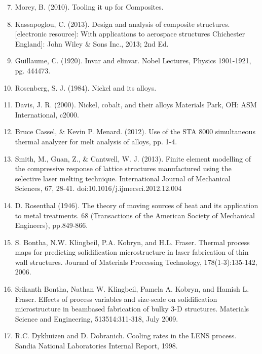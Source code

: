 \documentclass[10pt]{article}
\begin{document}
\begin{enumerate}
  \setcounter{enumi}{6}
  \item Morey, B. (2010). Tooling it up for Composites.

  \item Kassapoglou, C. (2013). Design and analysis of composite structures. [electronic resource]: With applications to aerospace structures Chichester England]: John Wiley \& Sons Inc., 2013; 2nd Ed.

  \item Guillaume, C. (1920). Invar and elinvar. Nobel Lectures, Physics 1901-1921, pg. 444473.

  \item Rosenberg, S. J. (1984). Nickel and its alloys.

  \item Davis, J. R. (2000). Nickel, cobalt, and their alloys Materials Park, OH: ASM International, c2000.

  \item Bruce Cassel, \& Kevin P. Menard. (2012). Use of the STA 8000 simultaneous thermal analyzer for melt analysis of alloys, pp. 1-4.

  \item Smith, M., Guan, Z., \& Cantwell, W. J. (2013). Finite element modelling of the compressive response of lattice structures manufactured using the selective laser melting technique. International Journal of Mechanical Sciences, 67, 28-41. doi:10.1016/j.ijmecsci.2012.12.004

  \item D. Rosenthal (1946). The theory of moving sources of heat and its application to metal treatments. 68 (Transactions of the American Society of Mechanical Engineers), pp.849-866.

  \item S. Bontha, N.W. Klingbeil, P.A. Kobryn, and H.L. Fraser. Thermal process maps for predicting solidification microstructure in laser fabrication of thin wall structures. Journal of Materials Processing Technology, 178(1-3):135-142, 2006.

  \item Srikanth Bontha, Nathan W. Klingbeil, Pamela A. Kobryn, and Hamish L. Fraser. Effects of process variables and size-scale on solidification microstructure in beambased fabrication of bulky 3-D structures. Materials Science and Engineering, 513514:311-318, July 2009.

  \item R.C. Dykhuizen and D. Dobranich. Cooling rates in the LENS process. Sandia National Laboratories Internal Report, 1998.


\end{enumerate}
\end{document}
